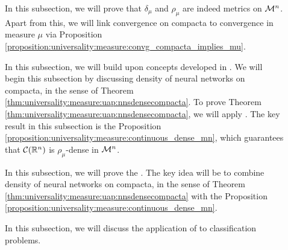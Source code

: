 \begin{description}
\item[] In this subsection, we will prove that $\delta_\mu$ and $\rho_\mu$ are indeed metrics on ${\mathcal M}^n$. Apart from this, we will link convergence on compacta to convergence in measure $\mu$ via Proposition \ref{proposition:universality:measure:convg_compacta_implies_mu}.
\item[] In this subsection, we will build upon concepts developed in . We will begin this subsection by discussing density of neural networks on compacta, 
in the sense of Theorem \ref{thm:universality:measure:uap:nnsdensecompacta}. To prove  Theorem \ref{thm:universality:measure:uap:nnsdensecompacta}, we will apply . The key result in this subsection is the Proposition 
\ref{proposition:universality:measure:continuous_dense_mn}, which guarantees that $\mathcal{C}({\mathbb R}^n)$ is $\rho_\mu$-dense in ${\mathcal M}^n$.
\item[] In this subsection, we will prove the .
The key idea will be to combine density of neural networks on compacta, 
in the sense of Theorem \ref{thm:universality:measure:uap:nnsdensecompacta} with the Proposition 
\ref{proposition:universality:measure:continuous_dense_mn}.
\item[] In this subsection, we will discuss the application of  to classification problems.
\end{description}




